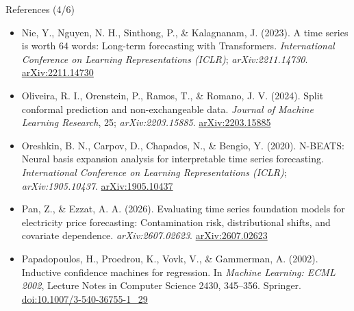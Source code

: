 \begin{frame}{References (4/6)}
\begin{itemize}
    \item Nie, Y., Nguyen, N. H., Sinthong, P., \& Kalagnanam, J. (2023). A time series is worth 64 words: Long-term forecasting with Transformers. \textit{International Conference on Learning Representations (ICLR)}; \textit{arXiv:2211.14730}. \href{https://arxiv.org/abs/2211.14730}{arXiv:2211.14730}
    \item Oliveira, R. I., Orenstein, P., Ramos, T., \& Romano, J. V. (2024). Split conformal prediction and non-exchangeable data. \textit{Journal of Machine Learning Research}, 25; \textit{arXiv:2203.15885}. \href{https://arxiv.org/abs/2203.15885}{arXiv:2203.15885}
    \item Oreshkin, B. N., Carpov, D., Chapados, N., \& Bengio, Y. (2020). N-BEATS: Neural basis expansion analysis for interpretable time series forecasting. \textit{International Conference on Learning Representations (ICLR)}; \textit{arXiv:1905.10437}. \href{https://arxiv.org/abs/1905.10437}{arXiv:1905.10437}
    \item Pan, Z., \& Ezzat, A. A. (2026). Evaluating time series foundation models for electricity price forecasting: Contamination risk, distributional shifts, and covariate dependence. \textit{arXiv:2607.02623}. \href{https://arxiv.org/abs/2607.02623}{arXiv:2607.02623}
    \item Papadopoulos, H., Proedrou, K., Vovk, V., \& Gammerman, A. (2002). Inductive confidence machines for regression. In \textit{Machine Learning: ECML 2002}, Lecture Notes in Computer Science 2430, 345--356. Springer. \href{https://doi.org/10.1007/3-540-36755-1_29}{doi:10.1007/3-540-36755-1\_29}
\end{itemize}
\end{frame}

